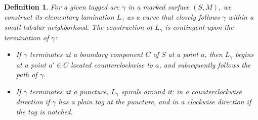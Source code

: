 \documentclass{article}
\newtheorem{definition}{Definition}
\theoremstyle{remark}
\begin{document}
\begin{definition}
    For a given tagged arc $\gamma$ in a marked surface $(S,M)$, we construct its \emph{elementary lamination} $L_{\gamma}$ as a curve that closely follows $\gamma$ within a small tubular neighborhood. The construction of $L_{\gamma}$ is contingent upon the termination of $\gamma$:
    \begin{itemize}
    \item If $\gamma$ terminates at a boundary component $C$ of $S$ at a point $a$, then $L_{\gamma}$ begins at a point $a' \in C$ located counterclockwise to $a$, and subsequently follows the path of $\gamma$.
    \item If $\gamma$ terminates at a puncture, $L_{\gamma}$ spirals around it: in a counterclockwise direction if $\gamma$ has a plain tag at the puncture, and in a clockwise direction if the tag is notched.
    \end{itemize}
\end{definition}
\end{document}
